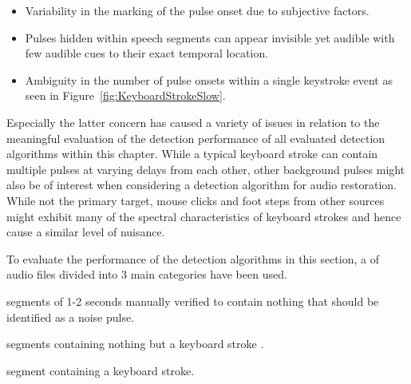 \begin{itemize}
  \item Variability in the marking of the pulse onset due to subjective factors.
  \item Pulses hidden within speech segments can appear invisible yet audible with few audible cues to their exact temporal location.
  \item Ambiguity in the number of pulse onsets within a single keystroke event as seen in Figure~\ref{fig:KeyboardStrokeSlow}.
\end{itemize}

Especially the latter concern has caused a variety of issues in relation to the meaningful evaluation of the detection performance of all evaluated detection algorithms within this chapter. While a typical keyboard stroke can contain multiple pulses at varying delays from each other, other background pulses might also be of interest when considering a detection algorithm for audio restoration. While not the primary target, mouse clicks and foot steps from other sources might exhibit many of the spectral characteristics of keyboard strokes and hence cause a similar level of nuisance.

To evaluate the performance of the detection algorithms in this section, a \DIFdelbegin {}\DIFdelend \DIFaddbegin {}\DIFaddend of audio files divided into 3 main categories have been used.

\begin{description} \DIFaddbegin \label{corrections:library}
  \DIFaddend \item[Speech] \DIFdelbegin {}\DIFdelend \DIFaddbegin {}\DIFaddend segments of 1-2 seconds manually verified to contain nothing that should be identified as a noise pulse.
  \item[Keyboard strokes] \DIFdelbegin {}\DIFdelend \DIFaddbegin {}\DIFaddend segments containing nothing but a keyboard stroke \DIFaddbegin {}\DIFaddend .
  \item[Mixed] \DIFdelbegin {}\DIFdelend \DIFaddbegin {}\DIFaddend segment containing a keyboard stroke. \DIFaddbegin {}\DIFaddend \end{description}

